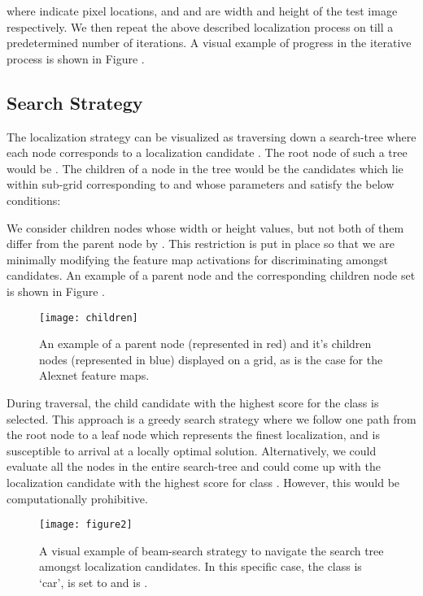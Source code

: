 \documentclass[runningheads]{llncs}
\begin{document}
\noindent where  indicate pixel locations, and  and  are width and height of the test image respectively. We then repeat the above described localization process on  till a predetermined number of iterations. A visual example of progress in the iterative process is shown in Figure .

\subsection{Search Strategy}
The localization strategy can be visualized as traversing down a search-tree where each node corresponds to a localization candidate . The root node of such a tree would be . The children of a node  in the tree would be the candidates  which lie within sub-grid corresponding to  and whose parameters  and  satisfy the below conditions:


We consider children nodes whose width or height values, but not both of them differ from the parent node by . This restriction is put in place so that we are minimally modifying the feature map activations for discriminating amongst candidates. An example of a parent node  and the corresponding  children node set   is shown in Figure .

\begin{figure}
\begin{center}
\texttt{[image: children]}
\end{center}
   \caption{An example of a parent node (represented in red) and it's children nodes (represented in blue) displayed on a  grid, as is the case for the Alexnet  feature maps. }
\label{fig:children}
\end{figure}


During traversal, the child candidate with the highest  score for the class   is selected. This approach is a greedy search strategy where we follow one path from the root node to a leaf node which represents the finest localization, and is susceptible to arrival at a locally optimal solution. Alternatively, we could evaluate all the nodes in the entire search-tree and could come up with the localization candidate with the highest score for class . However, this would be computationally prohibitive.
\begin{figure*}
\begin{center}
\texttt{[image: figure2]}
\end{center}
   \caption{A visual example of beam-search strategy to navigate the search tree amongst localization candidates. In this specific case, the class  is `car',  is set to  and  is .}
\label{fig:beamsearch}
\end{figure*}
\end{document}
